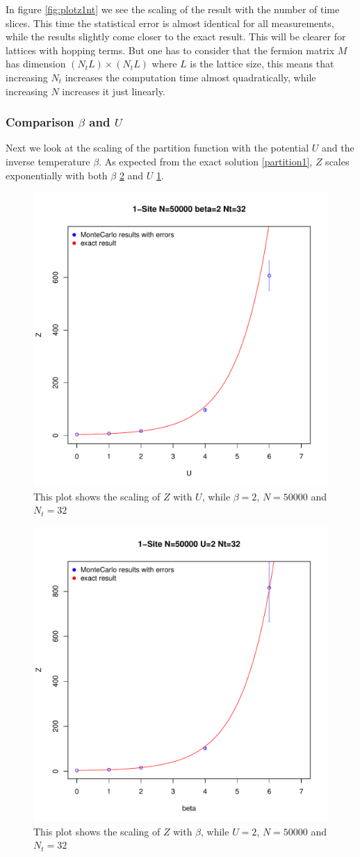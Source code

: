 In figure \ref{fig:plotz1nt} we see the scaling of the result with the number of time slices. This time the statistical error is almost identical for all measurements, while the results slightly come closer to the exact result. This will be clearer for lattices with hopping terms. But one has to consider that the fermion matrix $M$ has dimension $(N_tL)\times(N_tL)$ where $L$ is the lattice size, this means that increasing $N_t$ increases the computation time almost quadratically, while increasing $N$ increases it just linearly.
\subsubsection{Comparison $\beta$ and $U$}
Next we look at the scaling of the partition function with the potential $U$ and the inverse temperature $\beta$.
As expected from the exact solution \eqref{partition1}, $Z$ scales exponentially with both $\beta$ \ref{fig:plotz1b} and $U$ \ref{fig:plotz1u}. 
\begin{figure}[H]
	\centering
	\includegraphics[width=0.5\linewidth]{figs/plot_Z1U}
	\caption[Scaling of Z with U]{This plot shows the scaling of $Z$ with $U$, while $\beta=2$, $N=50000$ and $N_t=32$}
	\label{fig:plotz1u}
\end{figure}

\begin{figure}[H]
	\centering
	\includegraphics[width=0.5\linewidth]{figs/plot_Z1b}
	\caption[Scaling of Z with beta]{This plot shows the scaling of $Z$ with $\beta$, while $U=2$, $N=50000$ and $N_t=32$}
	\label{fig:plotz1b}
\end{figure}

